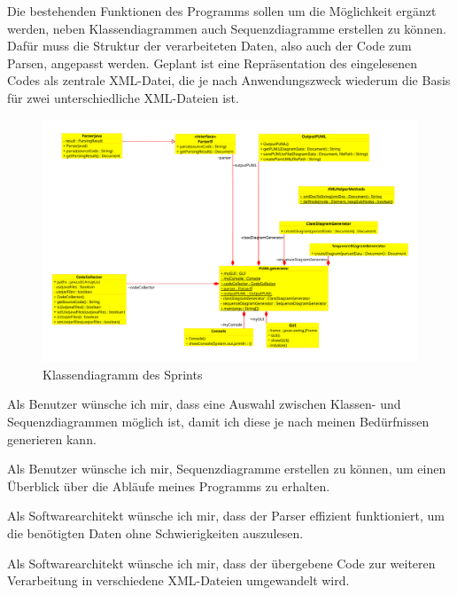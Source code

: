 Die bestehenden Funktionen des Programms sollen um die Möglichkeit ergänzt werden, neben Klassendiagrammen auch Sequenzdiagramme erstellen zu können. Dafür muss die Struktur der verarbeiteten Daten, also auch der Code zum Parsen, angepasst werden. Geplant ist eine Repräsentation des eingelesenen Codes als zentrale XML-Datei, die je nach Anwendungszweck wiederum die Basis für zwei unterschiedliche XML-Dateien ist.


\begin{figure}[hbtp]
\centering
\includegraphics[width=\textwidth]{Bilder/classDiagrammSprint3.png}
\caption{Klassendiagramm des Sprints}
\end{figure}




\nsecend %

Als Benutzer wünsche ich mir, dass eine Auswahl zwischen Klassen- und Sequenzdiagrammen möglich ist, damit ich diese je nach meinen Bedürfnissen generieren kann.
\nsecend

Als Benutzer wünsche ich mir, Sequenzdiagramme erstellen zu können, um einen Überblick über die Abläufe meines Programms zu erhalten.
\nsecend
\nsecend%

Als Softwarearchitekt wünsche ich mir, dass der Parser effizient funktioniert, um die benötigten Daten ohne Schwierigkeiten auszulesen.
\nsecend

Als Softwarearchitekt wünsche ich mir, dass der übergebene Code zur weiteren Verarbeitung in verschiedene XML-Dateien umgewandelt wird.
\nsecend
\nsecend%
\nsecend %


